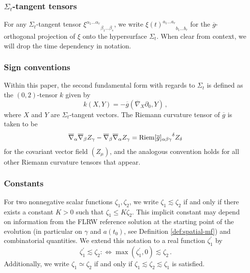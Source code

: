 \documentclass[11pt,leqno,textwidth=10cm]{amsart}
\numberwithin{equation}{section}
\theoremstyle{definition}
\theoremstyle{plain}
\newcommand{\1}{\mathbbm{1}}
\newcommand{\g}{\overline{g}}
\newcommand{\nabbar}{\overline{\nabla}}
\newcommand{\Riem}{\text{\normalfont{Riem}}}
\renewcommand{\epsilon}{\varepsilon}
\newcommand{\del}{\partial}
\newcommand{\change}[1]{\color{black}#1\color{black}}
\begin{document}
\subsubsection{$\Sigma_t$-tangent tensors}\label{subsubsec:notation-tangent}

For any $\Sigma_t$-tangent tensor ${\xi^{\alpha_1\dots\alpha_r}}_{\beta_1\dots\beta_s}$, we write ${{\xi(t)}^{a_1\dots a_r}}_{b_1\dots b_r}$ for the $\g$-orthogonal projection of $\xi$ onto the hypersurface $\Sigma_t$. When clear from context, we will drop the time dependency in notation.


\subsubsection{Sign conventions}\label{subsubsec:notation-sign}

Within this paper, the second fundamental form with regards to $\Sigma_t$ is defined \change{as the $(0,2)$-tensor $k$ given by
\[k(X,Y)=-\g(\nabbar_X\del_0,Y)\,,\]
where $X$ and $Y$ are $\Sigma_t$-tangent vectors}. The Riemann curvature tensor of $\g$ is taken to be
\change{\[\nabbar_\alpha\nabbar_\beta Z_\gamma-\nabbar_\beta \nabbar_{\alpha}Z_\gamma={\Riem[\g]_{\alpha\beta\gamma}}^\delta Z_\delta\]}
for the covariant vector field $(Z_\mu)$, and the analogous convention holds for all other Riemann curvature tensors that appear.

\subsubsection{Constants}\label{subsubsec:notation-constants}

For two nonnegative scalar functions $\zeta_1,\zeta_2$, we write $\zeta_1\lesssim\zeta_2$ \change{if and only if } there exists a constant $K>0$ such that $\zeta_1\leq K\zeta_2$. This implicit constant may depend on information from the FLRW reference solution at the starting point of the evolution (in particular on $\gamma$ and $a(t_0)$, see \change{Definition \ref{def:spatial-mf}}) and combinatorial quantities. We extend this notation to a real function $\zeta_1^\prime$ by
\[\zeta_1^\prime\lesssim\zeta_2 :\Leftrightarrow \max\left(\zeta_1^\prime,0\right)\lesssim\zeta_2\,.\]
Additionally, we write $\zeta_1\simeq\zeta_2$ \change{if and only if } $\zeta_1\lesssim\zeta_2\lesssim\zeta_1$ is satisfied.\\

\end{document}
